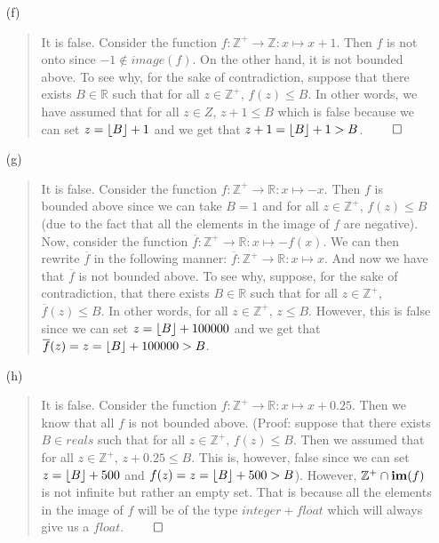 \documentclass[12pt, a4paper]{article}
\newcommand{\ints}{\mathbb{Z}}
\newcommand{\reals}{\mathbb{R}}
\newcommand{\pints}{\mathbb{Z}^+}
\DeclarePairedDelimiter\floor{\lfloor}{\rfloor}
\newcommand{\rarr}{\rightarrow}
\begin{document}
\begin{itemize}
\begin{itemize}
\item[]

\item[(f)]
\begin{quote}
It is false. Consider the function $f : \pints \rarr \ints : x \mapsto x + 1$.
Then $f$ is not onto since $-1 \notin image(f)$. On the other hand, it is not bounded
above. To see why, for the sake of contradiction, suppose that there exists $B \in \reals$
such that for all $z \in \pints$, $f(z) \leq B$. In other words, we have assumed
that for all $z \in Z$, $z + 1 \leq B$ which is false because we can set $z = \floor{B} + 1$
and we get that $z + 1 = \floor{B} + 1 > B$.
$\qed$
\end{quote}

\item[]

\item[(g)]
\begin{quote}
It is false. Consider the function $f : \pints \rarr \reals : x \mapsto -x$. Then $f$
is bounded above since we can take $B = 1$ and for all $z \in \pints$, $f(z) \leq B$ (due to the fact
that all the elements in the image of $f$ are negative).
Now, consider the function $\overline{f} : \pints \rarr \reals : x \mapsto -f(x)$.
We can then rewrite $\overline{f}$ in the following manner: $\overline{f} : \pints \rarr \reals : x \mapsto x$.
And now we have that $\overline{f}$ is not bounded above. To see why, suppose, for the sake of contradiction, that
there exists $B \in \reals$ such that for all $z \in \pints$, $\overline{f}(z) \leq B$.
In other words, for all $z \in \pints$, $z \leq B$. However, this is false since we can set $z = \floor{B} + 100000$
and we get that $\overline{f}(z) = z = \floor{B} + 100000 > B$.
\end{quote}
\item[]

\item[(h)]
\begin{quote}
It is false. Consider the function $f : \pints \rarr \reals : x \mapsto x + 0.25$.
Then we know that all $f$ is not bounded above. (Proof: suppose that there exists $B \in reals$
such that for all $z \in \pints$, $f(z) \leq B$. Then we assumed that for all $z \in \pints$, $z + 0.25 \leq B$.
This is, however, false since we can set $z = \floor{B} + 500$ and $f(z) = z = \floor{B} + 500 > B$).
However, $\pints \cap \mbox{\textbf{im}}(f)$ is not infinite but rather an empty set. That is because
all the elements in the image of $f$ will be of the type $integer + float$ which will always give us a $float$.
$\qed$
\end{quote}


\end{itemize}
\end{itemize}
\end{document}
